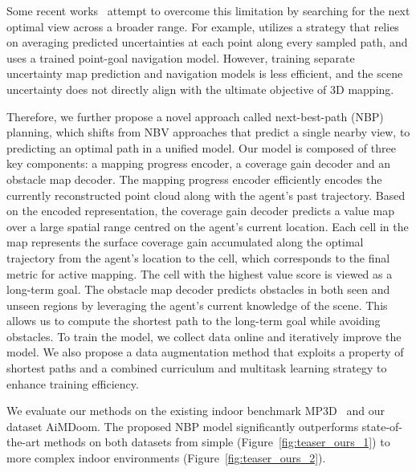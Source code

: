 Some recent works~\citep{chen2024gennbv, feng2024naruto, zhan2022activermap, upen} attempt to overcome this limitation by searching for the next optimal view across a broader range. 
For example, 
{\cite{upen} utilizes a strategy that relies on averaging predicted uncertainties at each point along every sampled path, and uses a trained point-goal navigation model.}
However, training separate uncertainty map prediction and navigation models is less efficient, and the scene uncertainty does not directly align with the ultimate objective of 3D mapping.





Therefore, we further propose a novel approach called next-best-path (NBP) planning, which shifts from NBV approaches that predict a single nearby view, to predicting an optimal path in a unified model.
Our model is composed of three key components: a mapping progress encoder, a coverage gain decoder and an obstacle map decoder.
The mapping progress encoder efficiently encodes the currently reconstructed point cloud along with the agent's past trajectory.
Based on the encoded representation, the coverage gain decoder predicts a value map over a large spatial range centred on the agent's current location. Each cell in the map represents the surface coverage gain accumulated along the optimal trajectory from the agent's location to the cell, which corresponds to the final metric for active mapping. The cell with the highest value score is viewed as a long-term goal.
The obstacle map decoder predicts obstacles in both seen and unseen regions by leveraging the agent's current knowledge of the scene. This allows us to compute the shortest path to the long-term goal while avoiding obstacles. To train the model, we collect data online and iteratively improve the model. We also propose a data augmentation method that exploits a property of shortest paths and a combined curriculum and multitask learning strategy to enhance training efficiency. 

We evaluate our methods on the existing indoor benchmark MP3D~\citep{Matterport3D} and our dataset AiMDoom.
The proposed NBP model significantly outperforms state-of-the-art methods on both datasets from simple (Figure~\ref{fig:teaser_ours_1}) to more complex indoor environments (Figure~\ref{fig:teaser_ours_2}).

